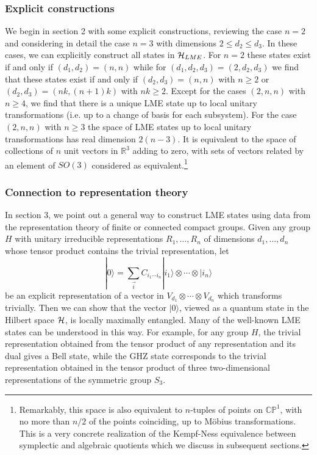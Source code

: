 \documentclass[12pt]{article}
\theoremstyle{definition}
\newcommand{\be}{\begin{equation}}
\newcommand{\ee}{\end{equation}}
\begin{document}
\subsubsection{Explicit constructions}

We begin in section 2 with some explicit constructions, reviewing the
case $n=2$ and considering in detail the case $n=3$ with dimensions $2
\le d_2 \le d_3$. In these cases, we can explicitly construct all
states in ${\cal H}_{LME}$. For $n=2$ these states exist if and only
if $(d_1,d_2) = (n,n)$ while for $(d_1, d_2, d_3) = (2,d_2,d_3)$ we
find that these states exist if and only if $(d_2,d_3) = (n,n)$ with
$n \ge 2$ or $(d_2,d_3) = (nk,(n+1)k)$ with $nk \ge 2$. Except for the
cases $(2,n,n)$ with $n \ge 4$, we find that there is a unique LME
state up to local unitary transformations (i.e. up to a change of
basis for each subsystem). For the case $(2,n,n)$ with $n \ge 3$ the
space of LME states up to local unitary transformations has real
dimension $2(n-3)$. It is equivalent to the space of collections of
$n$ unit vectors in $\mathbb{R}^3$ adding to zero, with sets of
vectors related by an element of $SO(3)$ considered as
equivalent.\footnote{Remarkably, this space is also equivalent to $n$-tuples of
points on $\mathbb{CP}^{1}$, with no more than $n/2$ of the points
coinciding, up to M\"obius transformations. This is a very concrete
realization of the Kempf-Ness equivalence between symplectic 
and algebraic quotients which we discuss in subsequent sections.}

\subsubsection{Connection to representation theory}

In section 3, we point out a general way to construct LME states using
data from the representation theory of finite or connected compact
groups. Given any group $H$ with unitary irreducible representations
$R_1,\dots ,R_n$ of dimensions $d_1, \dots, d_n$ whose tensor product
contains the trivial representation, let \be |0 \rangle =
\sum_{\vec{i}} C_{i_1 \cdots i_n} |i_1 \rangle \otimes \cdots \otimes
|i_n \rangle \ee be an explicit representation of a vector in $V_{d_1}
\otimes \cdots \otimes V_{d_n}$ which transforms trivially. Then we
can show that the vector $|0 \rangle$, viewed as a quantum state in
the Hilbert space ${\cal H}$, is locally maximally entangled. Many of
the well-known LME states can be understood in this way. For example,
for any group $H$, the trivial representation obtained from the tensor
product of any representation and its dual gives a Bell state, while
the GHZ state corresponds to the trivial representation obtained in
the tensor product of three two-dimensional representations of the
symmetric group $S_3$.
\end{document}
